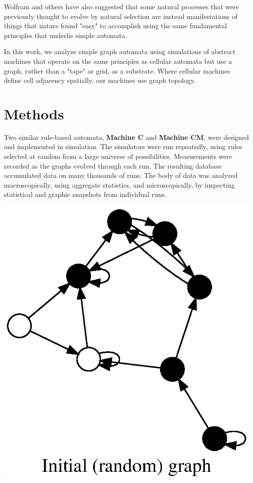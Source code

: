 \documentclass{tufte-handout}
\begin{document}
Wolfram and others have also suggested that some natural processes that were
previously thought to evolve by natural selection are instead
manifestations of things that nature found "easy" to accomplish using
the same fundamental principles that underlie simple automata.

In this work, we analyze simple graph automata using simulations of abstract
machines that operate on the same principles as
cellular automata but use a graph, rather than a "tape" or grid, as a substrate.
Where cellular machines define cell adjacency spatially, our machines use graph topology.


\section{Methods}

Two similar rule-based automata, \textbf{Machine C} and \textbf{Machine CM}, were designed
and implemented in simulation. The simulators were run repeatedly, using rules
selected at random from a large universe of possibilities. Measurements were recorded as the graphs
evolved through each run. The resulting database accumulated data on many thousands of runs. The body of data
was analyzed macroscopically, using aggregate statistics, and microscopically, by inspecting
statistical and graphic snapshots from individual runs.

\begin{marginfigure}
\hspace{-4em}
\includegraphics{5iters_0.ps}
\end{marginfigure}
\end{document}
